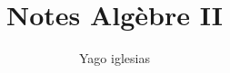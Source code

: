 \documentclass{article}
\theoremstyle{plain}
\theoremstyle{definition}
\theoremstyle{plain}
\begin{document}
\title{Notes Algèbre II}
\author{Yago iglesias}
\maketitle
\tableofcontents




\end{document}
